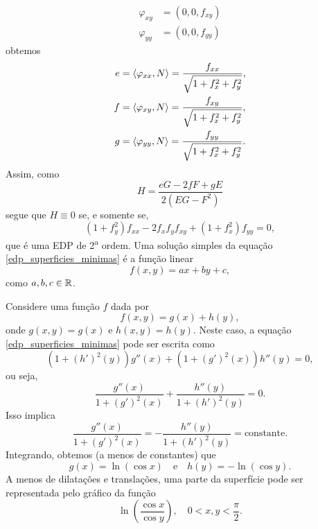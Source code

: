 \begin{exemplo}
\begin{align*}
	\varphi_{xy} &= (0, 0, f_{xy})\\
	\varphi_{yy} &= (0, 0, f_{yy})
	\end{align*}
	obtemos
	\begin{align*}
	e &= \left\langle \varphi_{xx},N \right\rangle = \frac{f_{xx}}{\sqrt{1 + f_x^2 + f_y^2}},\\
	f &= \left\langle \varphi_{xy},N \right\rangle = \frac{f_{xy}}{\sqrt{1 + f_x^2 + f_y^2}},\\
	g &= \left\langle \varphi_{yy},N \right\rangle = \frac{f_{yy}}{\sqrt{1 + f_x^2 + f_y^2}}.
	\end{align*}
	Assim, como
	\begin{equation*}
	H = \frac{eG - 2fF + gE}{2(EG - F^2)}
	\end{equation*}
	segue que $H \equiv 0$ se, e somente se,
	\begin{equation}\label{edp_superficies_minimas}
	(1 + f_y^2) f_{xx}  - 2 f_x f_y f_{xy} + (1+f_x^2) f_{yy} = 0,
	\end{equation}
	que é uma EDP de 2\textsuperscript{a} ordem.
	Uma solução simples da equação \eqref{edp_superficies_minimas} é a função linear
	\begin{equation*}
	f(x,y) = ax + by + c,
	\end{equation*}
	como $a, b, c \in \mathbb{R}$.
\end{exemplo}

\begin{exemplo}
	Considere uma função $f$ dada por
	\begin{equation*}
	f(x,y) = g(x) + h(y),
	\end{equation*}
	onde  $g(x,y)=g(x)$ e $h(x,y)=h(y)$. Neste caso, a equação \eqref{edp_superficies_minimas} pode ser escrita como
	\begin{equation*}
	(1 + (h')^2(y)) g''(x) + (1 + (g')^2(x)) h''(y) = 0,
	\end{equation*}
	ou seja,
	\begin{equation*}
	\frac{g''(x)}{1 + (g')^2(x)} + \frac{h''(y)}{1 + (h')^2(y)} = 0.
	\end{equation*}
	Isso implica
	\begin{equation*}
	\frac{g''(x)}{1 + (g')^2(x)} = - \frac{h''(y)}{1 + (h')^2(y)} = \text{constante}.
	\end{equation*}
	Integrando, obtemos (a menos de constantes) que
	\begin{equation*}
	g(x) = \ln (\cos x) \quad \text{e} \quad h(y) = -\ln (\cos y).
	\end{equation*}
	A menos de dilatações e translações, uma parte da superfície pode ser representada pelo gráfico da função
	\begin{equation*}
	\ln \left( \frac{\cos x}{\cos y} \right), \quad 0 < x,y < \frac{\pi}{2}.
	\end{equation*}
\end{exemplo}

